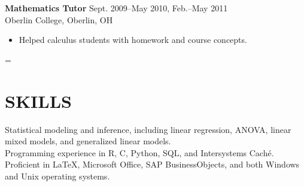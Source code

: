 \documentclass[line]{res}
\newenvironment{absolutelynopagebreak}
  {\par\nobreak\vfil\penalty0\vfilneg
   \vtop\bgroup}
  {\par\xdef\tpd{\the\prevdepth}\egroup
   \prevdepth=\tpd}
\begin{document}
\begin{resume}
\vspace{12pt}
\begin{absolutelynopagebreak}
   {\bf Mathematics Tutor} \hfill Sept. 2009--May 2010, Feb.--May 2011\\
Oberlin College, Oberlin, OH
\begin{itemize}
\item Helped calculus students with homework and course concepts.
\end{itemize}
\end{absolutelynopagebreak}


   
\section{SKILLS}
Statistical modeling and inference, including linear regression,
ANOVA, linear mixed models, and
generalized linear models.\\[6pt]
Programming experience in R, C, Python, SQL, and Intersystems Cach\'{e}.\\[6pt]
Proficient in  \LaTeX, Microsoft Office, SAP BusinessObjects, and both Windows
and Unix operating systems. \\[6pt]

\end{resume}
\end{document}
